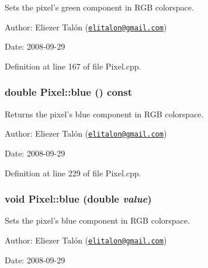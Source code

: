Sets the pixel's green component in RGB colorspace. 

\begin{Desc}
\item[Author:]Eliezer Talón (\href{mailto:elitalon@gmail.com}{\tt elitalon@gmail.com}) \end{Desc}
\begin{Desc}
\item[Date:]2008-09-29 \end{Desc}


Definition at line 167 of file Pixel.cpp.\hypertarget{class_pixel_978b4078a48ff2a67b55dd10eec78fb2}{
\subsubsection[blue]{\setlength{\rightskip}{0pt plus 5cm}double Pixel::blue () const}}
\label{class_pixel_978b4078a48ff2a67b55dd10eec78fb2}


Returns the pixel's blue component in RGB colorspace. 

\begin{Desc}
\item[Author:]Eliezer Talón (\href{mailto:elitalon@gmail.com}{\tt elitalon@gmail.com}) \end{Desc}
\begin{Desc}
\item[Date:]2008-09-29 \end{Desc}


Definition at line 229 of file Pixel.cpp.\hypertarget{class_pixel_ff3909b84c97a1c3d14a773c8825ade1}{
\subsubsection[blue]{\setlength{\rightskip}{0pt plus 5cm}void Pixel::blue (double {\em value})}}
\label{class_pixel_ff3909b84c97a1c3d14a773c8825ade1}


Sets the pixel's blue component in RGB colorspace. 

\begin{Desc}
\item[Author:]Eliezer Talón (\href{mailto:elitalon@gmail.com}{\tt elitalon@gmail.com}) \end{Desc}
\begin{Desc}
\item[Date:]2008-09-29 \end{Desc}


